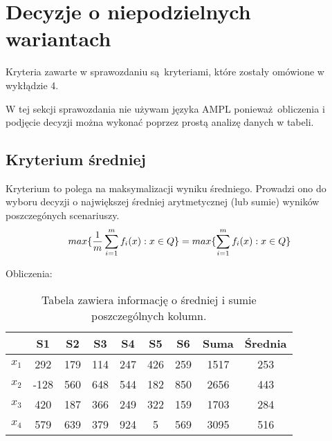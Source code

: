 \documentclass{article}
\begin{document}
\newpage

\section{Decyzje o niepodzielnych wariantach}

Kryteria zawarte w sprawozdaniu są kryteriami, które zostały omówione w wykłądzie 4.

W tej sekcji sprawozdania nie używam języka AMPL ponieważ obliczenia i podjęcie decyzji można wykonać poprzez
prostą analizę danych w tabeli.

\subsection{Kryterium średniej}


Kryterium to polega na maksymalizacji wyniku średniego. Prowadzi ono do wyboru decyzji o największej średniej arytmetycznej (lub sumie) 
wyników poszczegónych scenariuszy. \\

\begin{equation}
    \centering
    max\{\frac{1}{m} \sum^{m}_{i=1} f_{i}(x) : x \in Q\} = max \{ \sum^{m}_{i=1} f_{i}(x) : x \in Q \}
\end{equation}

Obliczenia:

\begin{table}[H]
  \begin{center}
    \begin{tabular}{ c |  c  c   c   c   c   c  | c | c  }
      & S1 & S2 & S3 & S4 & S5 & S6 & Suma & Średnia \\
      \hline
      $x_1$ & 292 & 179 & 114 & 247 & 426 & 259 & 1517 & 253 \\
      $x_2$ & -128 & 560 & 648 & 544 & 182 & 850 & 2656 & 443 \\
      $x_3$ & 420 & 187 & 366 & 249 & 322 & 159 & 1703 & 284 \\
      $x_4$ & 579 & 639 & 379 & 924 & 5 & 569 & \cellcolor{orange!25} 3095 & \cellcolor{orange!25} 516 \\
      \hline
    \end{tabular} 
    \caption{\label{table:avg}Tabela zawiera informację o średniej i sumie poszczególnych kolumn.}
  \end{center}
\end{table}
\end{document}
